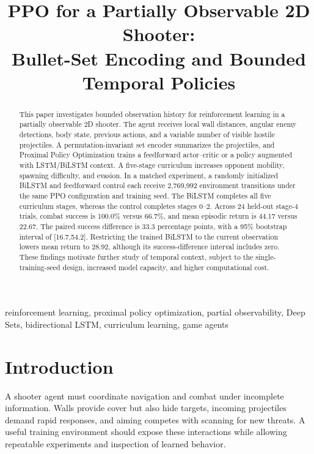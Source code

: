\documentclass[conference]{IEEEtran}
\begin{document}
\title{PPO for a Partially Observable 2D Shooter:\\Bullet-Set Encoding and Bounded Temporal Policies}
\author{}
\maketitle

\begin{abstract}
This paper investigates bounded observation history for reinforcement learning in a partially observable 2D shooter. The agent receives local wall distances, angular enemy detections, body state, previous actions, and a variable number of visible hostile projectiles. A permutation-invariant set encoder summarizes the projectiles, and Proximal Policy Optimization trains a feedforward actor--critic or a policy augmented with LSTM/BiLSTM context. A five-stage curriculum increases opponent mobility, spawning difficulty, and evasion. In a matched experiment, a randomly initialized BiLSTM and feedforward control each receive 2,769,992 environment transitions under the same PPO configuration and training seed. The BiLSTM completes all five curriculum stages, whereas the control completes stages 0--2. Across 24 held-out stage-4 trials, combat success is 100.0\% versus 66.7\%, and mean episodic return is 44.17 versus 22.67. The paired success difference is 33.3 percentage points, with a 95\% bootstrap interval of [16.7,54.2]. Restricting the trained BiLSTM to the current observation lowers mean return to 28.92, although its success-difference interval includes zero. These findings motivate further study of temporal context, subject to the single-training-seed design, increased model capacity, and higher computational cost.
\end{abstract}

\begin{IEEEkeywords}
reinforcement learning, proximal policy optimization, partial observability, Deep Sets, bidirectional LSTM, curriculum learning, game agents
\end{IEEEkeywords}

\section{Introduction}
A shooter agent must coordinate navigation and combat under incomplete information. Walls provide cover but also hide targets, incoming projectiles demand rapid responses, and aiming competes with scanning for new threats. A useful training environment should expose these interactions while allowing repeatable experiments and inspection of learned behavior.
\end{document}
